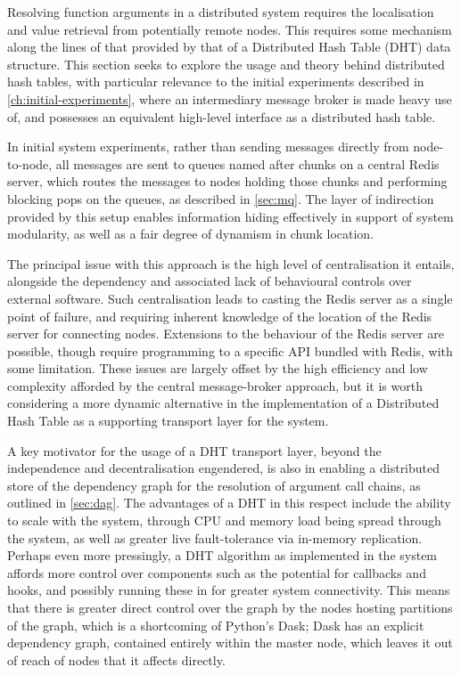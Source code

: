 Resolving function arguments in a distributed system requires the localisation and value retrieval from potentially remote nodes.
This requires some mechanism along the lines of that provided by that of a Distributed Hash Table (DHT) data structure.
This section seeks to explore the usage and theory behind distributed hash tables, with particular relevance to the initial experiments described in \cref{ch:initial-experiments}, where an intermediary message broker is made heavy use of, and possesses an equivalent high-level interface as a distributed hash table.

In initial system experiments, rather than sending messages directly from node-to-node, all messages are sent to queues named after chunks on a central Redis server, which routes the messages to nodes holding those chunks and performing blocking pops on the queues\cite{sanfilippo2009redis}, as described in \cref{sec:mq}.
The layer of indirection provided by this setup enables information hiding effectively in support of system modularity, as well as a fair degree of dynamism in chunk location.

The principal issue with this approach is the high level of centralisation it entails, alongside the dependency and associated lack of behavioural controls over external software\cite{john2017survey}.
Such centralisation leads to casting the Redis server as a single point of failure, and requiring inherent knowledge of the location of the Redis server for connecting nodes.
Extensions to the behaviour of the Redis server are possible, though require programming to a specific API bundled with Redis, with some limitation.
These issues are largely offset by the high efficiency and low complexity afforded by the central message-broker approach, but it is worth considering a more dynamic alternative in the implementation of a Distributed Hash Table as a supporting transport layer for the system.


A key motivator for the usage of a DHT transport layer, beyond the independence and decentralisation engendered, is also in enabling a distributed store of the dependency graph for the resolution of argument call chains, as outlined in \cref{sec:dag}.
The advantages of a DHT in this respect include the ability to scale with the system, through CPU and memory load being spread through the system, as well as greater live fault-tolerance via in-memory replication\cite{lua2005p2p}.
Perhaps even more pressingly, a DHT algorithm as implemented in the system affords more control over components such as the potential for callbacks and hooks, and possibly running these in \R{} for greater system connectivity.
This means that there is greater direct control over the graph by the nodes hosting partitions of the graph, which is a shortcoming of Python's Dask; Dask has an explicit dependency graph, contained entirely within the master node, which leaves it out of reach of nodes that it affects directly\cite{rocklin2015dask}.

